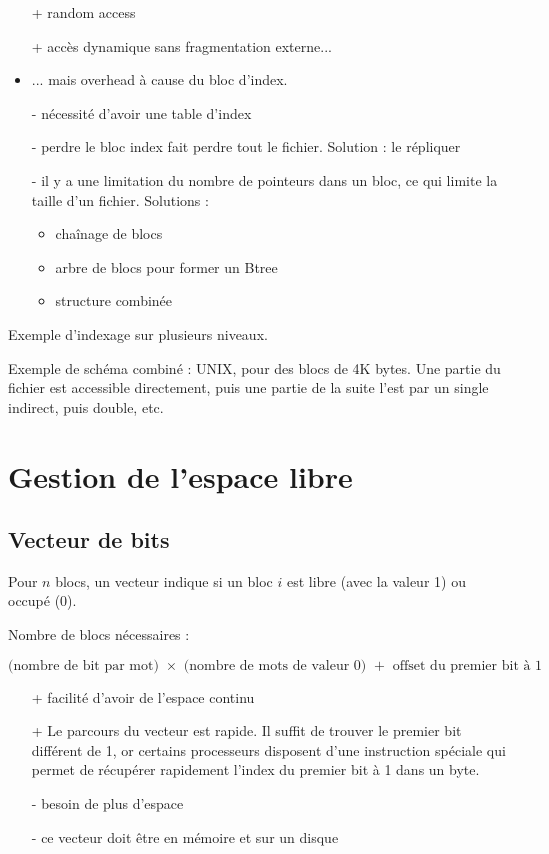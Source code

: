 	
	\begin{itemize}
		\item[+] random access
		\item[+] accès dynamique sans fragmentation externe...
		\item ... mais overhead à cause du bloc d'index.
		\item[-] nécessité d'avoir une table d'index
		\item[-] perdre le bloc index fait perdre tout le fichier. Solution : le répliquer
		\item[-] il y a une limitation du nombre de pointeurs dans un bloc, ce qui limite la taille d'un fichier. Solutions : 
		
		\begin{itemize}
			\item chaînage de blocs
			\item arbre de blocs pour former un Btree
			\item structure combinée
		\end{itemize}				
		
	\end{itemize}
	
	Exemple d'indexage sur plusieurs niveaux.
	
	
	Exemple de schéma combiné : UNIX, pour des blocs de 4K bytes. Une partie du fichier est accessible directement, puis une partie de la suite l'est par un single indirect, puis double, etc.
	
	
\section{Gestion de l'espace libre}

	\subsection{Vecteur de bits}
	
	Pour $n$ blocs, un vecteur indique si un bloc $i$ est libre (avec la valeur 1) ou occupé (0). 
	
	Nombre de blocs nécessaires :
	
	$$\text{(nombre de bit par mot) } \times \text{ (nombre de mots de valeur 0) } + \text{ offset du premier bit à 1}$$
	
	\begin{itemize}
		\item[+] facilité d'avoir de l'espace continu
		\item[+] Le parcours du vecteur est rapide. Il suffit de trouver le premier bit différent de 1, or certains processeurs disposent d'une instruction spéciale qui permet de récupérer rapidement l'index du premier bit à 1 dans un byte.
		\item[-] besoin de plus d'espace
		\item[-] ce vecteur doit être en mémoire et sur un disque
	\end{itemize}
	
